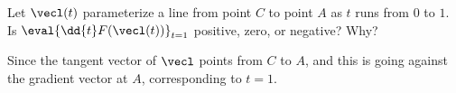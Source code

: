 \documentclass{ximera}
\begin{document}
\begin{problem}
  Let $\vecl(t)$ parameterize a line from point $C$ to point $A$ as $t$
  runs from $0$ to $1$. Is $\eval{\dd{t} F(\vecl(t))}_{t=1}$ positive, zero, or
  negative? Why?
  \begin{prompt}
    \begin{multipleChoice}
    \end{multipleChoice}
    \begin{feedback}
      Since the tangent vector of $\vecl$ points from $C$ to $A$, and
      this is going against the gradient vector at $A$, corresponding
      to $t=1$.
    \end{feedback}
  \end{prompt}
\end{problem}
\end{document}
